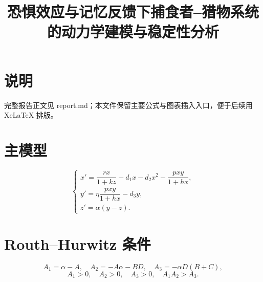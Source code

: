 \documentclass[UTF8]{ctexart}
\title{恐惧效应与记忆反馈下捕食者--猎物系统的动力学建模与稳定性分析}
\author{}
\date{}
\begin{document}
\maketitle
\section*{说明}
完整报告正文见 report.md；本文件保留主要公式与图表插入入口，便于后续用 XeLaTeX 排版。
\section*{主模型}
\[
\begin{cases}
x'=\dfrac{rx}{1+kz}-d_1x-d_2x^2-\dfrac{pxy}{1+hx},\\
y'=\eta\dfrac{pxy}{1+hx}-d_3y,\\
z'=\alpha(y-z).
\end{cases}
\]
\section*{Routh--Hurwitz 条件}
\[
A_1=\alpha-A,\quad A_2=-A\alpha-BD,\quad A_3=-\alpha D(B+C),
\]
\[
A_1>0,\quad A_2>0,\quad A_3>0,\quad A_1A_2>A_3.
\]
\end{document}
